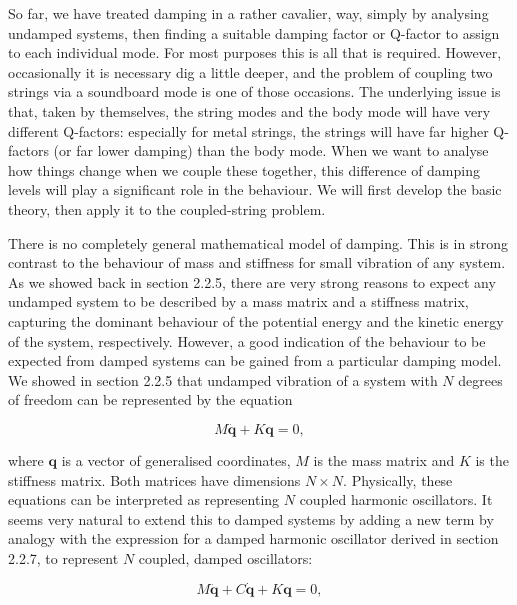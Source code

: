   So far, we have treated damping in a rather cavalier, way, simply by 
  analysing undamped systems, then finding a suitable damping factor or 
  Q-factor to assign to each individual mode. For most purposes this is all 
  that is required. However, occasionally it is necessary dig a little deeper, 
  and the problem of coupling two strings via a soundboard mode is one of those 
  occasions. The underlying issue is that, taken by themselves, the string 
  modes and the body mode will have very different Q-factors: especially for 
  metal strings, the strings will have far higher Q-factors (or far lower 
  damping) than the body mode. When we want to analyse how things change when 
  we couple these together, this difference of damping levels will play a 
  significant role in the behaviour. We will first develop the basic theory, 
  then apply it to the coupled-string problem. 

  There is no completely general mathematical model of damping. This is in 
  strong contrast to the behaviour of mass and stiffness for small vibration of 
  any system. As we showed back in section 2.2.5, there are very strong reasons 
  to expect any undamped system to be described by a mass matrix and a 
  stiffness matrix, capturing the dominant behaviour of the potential energy 
  and the kinetic energy of the system, respectively. However, a good 
  indication of the behaviour to be expected from damped systems can be gained 
  from a particular damping model. We showed in section 2.2.5 that undamped 
  vibration of a system with $N$ degrees of freedom can be represented by the 
  equation 

  \begin{equation*}M \ddot{\mathbf{q}} + K \mathbf{q}= 0, 
  \tag{1}\end{equation*} 

  \noindent{}where $\mathbf{q}$ is a vector of generalised coordinates, $M$ is 
  the mass matrix and $K$ is the stiffness matrix. Both matrices have 
  dimensions $N \times N$. Physically, these equations can be interpreted as 
  representing $N$ coupled harmonic oscillators. It seems very natural to 
  extend this to damped systems by adding a new term by analogy with the 
  expression for a damped harmonic oscillator derived in section 2.2.7, to 
  represent $N$ coupled, damped oscillators: 

  \begin{equation*}M \ddot{\mathbf{q}} + C \dot{\mathbf{q}} + K \mathbf{q}= 0, 
  \tag{2}\end{equation*} 

